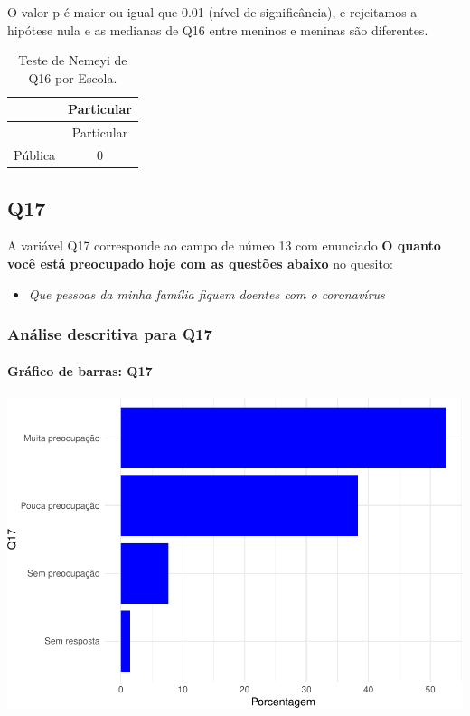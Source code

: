 \documentclass[]{article}
\providecommand{\tightlist}{%
  \setlength{\itemsep}{0pt}\setlength{\parskip}{0pt}}
\let\oldparagraph\paragraph
\renewcommand{\paragraph}[1]{\oldparagraph{#1}\mbox{}}
\begin{document}
O valor-p é maior ou igual que 0.01 (nível de significância), e rejeitamos a hipótese nula e as medianas de Q16 entre meninos e meninas são diferentes.

\begin{longtable}[]{@{}lc@{}}
\caption{\label{tab:unnamed-chunk-179}Teste de Nemeyi de Q16 por Escola.}\tabularnewline
\toprule
& Particular\tabularnewline
\midrule
\endfirsthead
\toprule
& Particular\tabularnewline
\midrule
\endhead
Pública & 0\tabularnewline
\bottomrule
\end{longtable}

\cleardoublepage

\hypertarget{q17}{%
\subsection{Q17}\label{q17}}

A variável Q17 corresponde ao campo de númeo 13 com enunciado \textbf{O quanto você está preocupado hoje com as questões abaixo} no quesito:

\begin{itemize}
\tightlist
\item
  \emph{Que pessoas da minha família fiquem doentes com o coronavírus}
\end{itemize}

\hypertarget{anuxe1lise-descritiva-para-q17}{%
\subsubsection{Análise descritiva para Q17}\label{anuxe1lise-descritiva-para-q17}}

\hypertarget{gruxe1fico-de-barras-q17}{%
\paragraph{Gráfico de barras: Q17}\label{gruxe1fico-de-barras-q17}}

\begin{center}\includegraphics[width=0.75\linewidth]{relatorio_covid19_files/figure-latex/unnamed-chunk-186-1} \end{center}
\end{document}
